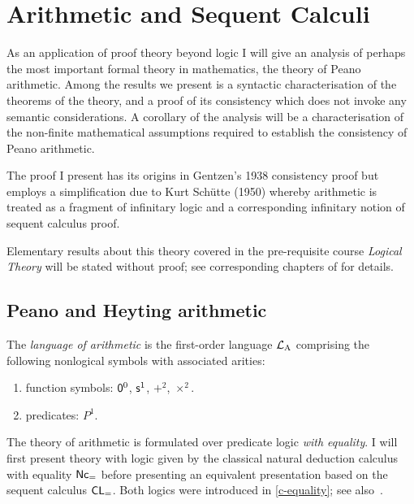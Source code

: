%
\chapter{Arithmetic and Sequent Calculi}\label{c-oa-arith}
%
As an application of proof theory beyond logic I will give an analysis of perhaps the most important formal theory in mathematics, the theory of Peano arithmetic.
Among the results we present is a syntactic characterisation of the theorems of the theory, and a proof of its consistency which does not invoke any semantic considerations.
A corollary of the analysis will be a characterisation of the non-finite mathematical assumptions required to establish the consistency of Peano arithmetic.

The proof I present has its origins in Gentzen's 1938 consistency proof\nocite{Gen-1938} but employs a simplification due to Kurt Schütte (1950)\nocite{Schu1950} whereby arithmetic is treated as a fragment of infinitary logic and a corresponding infinitary notion of sequent calculus proof.

Elementary results about this theory covered in the pre-requisite course \emph{Logical Theory} will be stated without proof; see corresponding chapters of \cite{LogThe} for details.

\section{Peano and Heyting arithmetic}\label{s-oa-arithmetic}
%
\begin{definition}
	The \emph{language of arithmetic} is the first-order language \( \mathcal{L}_{\mathrm{A}} \) comprising the following nonlogical symbols with associated arities:
	\begin{enumerate}
		\item function symbols: \( \mathsf{0}^0 \), \( \mathsf{s}^1 \), \( +^2 \), \( ×^2 \).
		\item predicates: \( P^1 \).
	\end{enumerate}
\end{definition}
%
The theory of arithmetic is formulated over predicate logic \emph{with equality}. 
I will first present theory with logic given by the classical natural deduction calculus with equality \( \mathsf{Nc_=} \) before presenting an equivalent presentation based on the sequent calculus \( \mathsf{CL}_= \).
Both logics were introduced in \cref{c-equality}; see also~\cite[§6.5]{Negri_von_Plato}.

